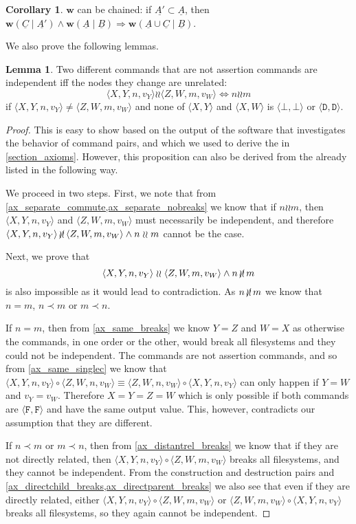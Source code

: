\documentclass[12pt]{article}
\newcommand{\empt}{\bot}
\newcommand{\ccharb}{\empt}
\newcommand{\ccharf}{\mathtt{F}}
\newcommand{\cchard}{\mathtt{D}}
\newcommand{\valvy}{v_Y} %
\newcommand{\valvw}{v_W}
\newcommand{\caa}[2]{\langle{#1,#2}\rangle}
\newcommand{\caaaa}[4]{\langle{#1,#2,#3,#4}\rangle}
\newcommand{\cbb}{\caa{\ccharb}{\ccharb}}
\newcommand{\cff}{\caa{\ccharf}{\ccharf}}
\newcommand{\cdd}{\caa{\cchard}{\cchard}}
\newcommand{\cxy}{\caa{X}{Y}}
\newcommand{\cxynv}{\caaaa{X}{Y}{n}{\valvy}}
\newcommand{\cxw}{\caa{X}{W}}
\newcommand{\czwnv}{\caaaa{Z}{W}{n}{\valvw}}
\newcommand{\czwmv}{\caaaa{Z}{W}{m}{\valvw}}
\newcommand{\cc}{\circ} %
\newcommand{\descendant}{\prec}
\newcommand{\indep}{\mathrel{\wr\wr}} %
\newcommand{\unrel}{\indep} %
\newcommand{\nindep}{\,{\centernot{\wr\wr}}\,} %
\newcommand{\nunrel}{\nindep} %
\newcommand{\workssign}{\mathbf{w}}
\newcommand{\worksc}[2]{\workssign({#1}\mathrel{|}{#2})}
\newcommand{\seqset}[1]{\underline{#1}} %
\theoremstyle{definition}
\newtheorem{mylem}{Lemma}
\newtheorem{mycor}{Corollary}
\begin{document}
\begin{mycor}\label{workschained}
$\workssign$ can be chained:
if $\seqset{A'}\subset\seqset{A}$, then
$ \worksc{\seqset{C}}{\seqset{A'}} \wedge \worksc{\seqset{A}}{\seqset{B}} \Rightarrow \worksc{\seqset{A}\cup\seqset{C}}{\seqset{B}}$.
\end{mycor}

We also prove the following lemmas.

\begin{mylem}\label{unrelated_is_independent}
Two different commands that are not assertion commands are independent iff the nodes they change are unrelated:
\[ \cxynv\indep\czwmv \Leftrightarrow n\unrel m \]
if $\cxynv\neq\czwmv$ and none of $\cxy$ and $\cxw$ is $\cbb$ or $\cdd$.
\end{mylem}
\begin{proof}
This is easy to show based on the output of the software that investigates the behavior of command pairs,
and which we used to derive the  in \cref{section_axioms}.
However, this proposition can also be derived from the  already listed
in the following way.

We proceed in two steps. First, we note that
from \cref{ax_separate_commute,ax_separate_nobreaks} we know that
if $n\unrel m$, then $\cxynv$ and $\czwmv$ must necessarily be independent, and therefore
$ \cxynv\nindep\czwmv \wedge n\unrel m $ cannot be the case.

Next, we prove that
\[ \cxynv\indep\czwmv \wedge n\nunrel m \] is also impossible as it would lead to contradiction.
As $n\nunrel m$
we know that $n=m$, $n\descendant m$ or $m\descendant n$.

If $n=m$, then from \cref{ax_same_breaks} we know $Y=Z$ and $W=X$
as otherwise the commands, in one order or the other, would break all filesystems
and they could not be independent.
The commands are not assertion commands, and so from \cref{ax_same_singlec}
we know that $\cxynv\cc\czwnv\equiv\czwnv\cc\cxynv$ can only happen if $Y=W$ and $\valvy=\valvw$.
Therefore $X=Y=Z=W$ which is only possible if both commands are $\cff$ and have the same
output value. This, however, contradicts our assumption that they are different.

If $n\descendant m$ or $m\descendant n$, then
from \cref{ax_distantrel_breaks} we know that if they are not directly related,
then $\cxynv\cc\czwmv$ breaks all filesystems, and they cannot be independent.
From the construction and destruction pairs and 
\cref{ax_directchild_breaks,ax_directparent_breaks} we also see that
even if they are directly related, either
$\cxynv\cc\czwmv$ or $\czwmv\cc\cxynv$ 
breaks all filesystems, so they again cannot be independent.
\end{proof}
\end{document}
